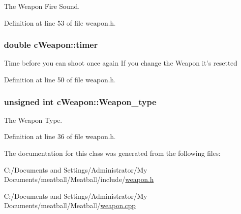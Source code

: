 The Weapon Fire Sound. 



Definition at line 53 of file weapon.\-h.

\hypertarget{classc_weapon_ad8adebfcb59e5f2cd61951f87691da6a}{
\subsubsection[{timer}]{\setlength{\rightskip}{0pt plus 5cm}double c\-Weapon\-::timer}}\label{classc_weapon_ad8adebfcb59e5f2cd61951f87691da6a}
Time before you can shoot once again If you change the Weapon it's resetted 

Definition at line 50 of file weapon.\-h.

\hypertarget{classc_weapon_a457996bcbe591da765dfb8b427a72f29}{
\subsubsection[{Weapon\-\_\-type}]{\setlength{\rightskip}{0pt plus 5cm}unsigned int c\-Weapon\-::\-Weapon\-\_\-type}}\label{classc_weapon_a457996bcbe591da765dfb8b427a72f29}


The Weapon Type. 



Definition at line 36 of file weapon.\-h.



The documentation for this class was generated from the following files\-:\begin{DoxyCompactItemize}
\item 
C\-:/\-Documents and Settings/\-Administrator/\-My Documents/meatball/\-Meatball/include/\hyperlink{weapon_8h}{weapon.\-h}\item 
C\-:/\-Documents and Settings/\-Administrator/\-My Documents/meatball/\-Meatball/\hyperlink{weapon_8cpp}{weapon.\-cpp}\end{DoxyCompactItemize}

